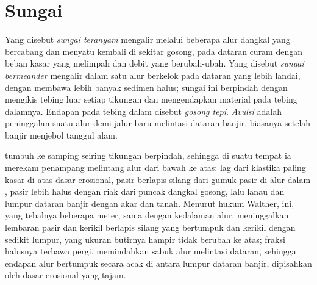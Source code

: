 \section{Sungai}\label{sec:b3:facies-models:rivers}

\begin{definition}\label{def:b3:facies-models:rivers}
Yang disebut \emph{sungai teranyam} mengalir melalui beberapa
alur dangkal yang bercabang dan menyatu kembali di sekitar gosong, pada dataran curam
dengan beban kasar yang melimpah dan debit yang berubah-ubah. Yang disebut \emph{sungai bermeander}
mengalir dalam satu alur berkelok pada dataran yang lebih landai, dengan membawa lebih banyak
sedimen halus; sungai ini berpindah dengan mengikis tebing luar setiap tikungan dan
mengendapkan material pada tebing dalamnya. Endapan pada tebing dalam disebut \emph{gosong
tepi}. \emph{Avulsi} adalah peninggalan
suatu alur demi jalur baru melintasi dataran banjir, biasanya setelah banjir
menjebol tanggul alam.
\end{definition}

 tumbuh ke samping seiring tikungan berpindah, sehingga di suatu tempat ia merekam
penampang melintang alur dari bawah ke atas: lag dari klastika paling kasar di atas
dasar erosional, pasir berlapis silang dari gumuk pasir di alur dalam
, pasir lebih halus dengan riak dari puncak dangkal gosong, lalu
lanau dan lumpur dataran banjir dengan akar dan tanah. Menurut hukum Walther,  ini, yang tebalnya beberapa meter, sama dengan
kedalaman alur.  meninggalkan lembaran pasir dan kerikil berlapis silang yang bertumpuk
dan kerikil dengan sedikit lumpur, yang ukuran butirnya hampir tidak berubah ke atas;
fraksi halusnya terbawa pergi.  memindahkan sabuk alur melintasi dataran, sehingga
endapan alur bertumpuk secara acak di antara lumpur dataran banjir, dipisahkan oleh dasar
erosional yang tajam.

